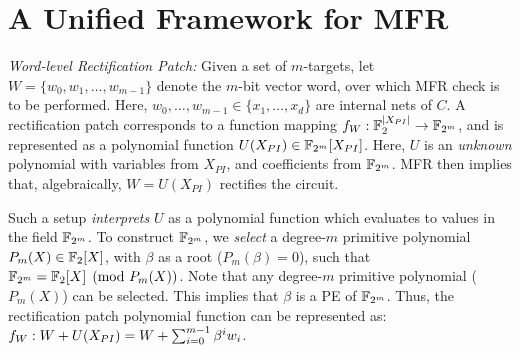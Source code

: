 \section{A Unified Framework for MFR}\label{sec:comps}


{\it Word-level Rectification Patch:} 
Given a set of $m$-targets, let $W = \{w_0,w_1,\dots,w_{m-1}\}$ denote the $m$-bit vector word,
over which MFR check is to be performed. 
Here, $w_0,\dots,w_{m-1}\in \{x_1,\dots,x_d\}$
are internal nets of $C$. A rectification patch corresponds to 
a function mapping $f_W: {\mathbb{F}}_2^{|X_{PI}|}\rightarrow{\mathbb{F}}_{2^m}$, and is 
represented as a polynomial function $U(X_{PI}) \in
{\mathbb{F}}_{2^m}[X_{PI}]$. Here, $U$ is an {\it unknown} polynomial
with variables from $X_{PI}$, and coefficients from ${\mathbb{F}}_{2^m}$. MFR
then implies that, algebraically, $W = U(X_{PI})$ rectifies the
circuit. 

Such a setup {\it interprets} $U$ as a polynomial function which
evaluates to values in the field ${\mathbb{F}}_{2^m}$. To construct ${\mathbb{F}}_{2^m}$,
we {\it select} a degree-$m$ primitive polynomial $P_m(X)\in{\mathbb{F}}_2[X]$, with
$\beta$ as a root ($P_m(\beta)=0$), such that 
${\mathbb{F}}_{2^m} = {\mathbb{F}}_2[X] \pmod{ P_m(X)}$. Note that any degree-$m$
primitive polynomial ($P_m(X)$) can be selected. This implies that
$\beta$ is a PE of ${\mathbb{F}}_{2^m}$. Thus, the rectification patch polynomial
function can be represented as: $f_W: W + U(X_{PI}) = W +
\sum_{i=0}^{m-1}\beta^iw_i$.  

